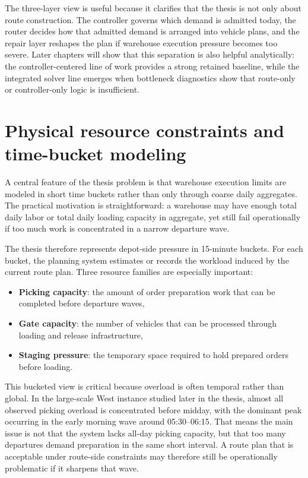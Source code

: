 The three-layer view is useful because it clarifies that the thesis is not only about route construction. The controller governs which demand is admitted today, the router decides how that admitted demand is arranged into vehicle plans, and the repair layer reshapes the plan if warehouse execution pressure becomes too severe. Later chapters will show that this separation is also helpful analytically: the controller-centered line of work provides a strong retained baseline, while the integrated solver line emerges when bottleneck diagnostics show that route-only or controller-only logic is insufficient.

\section{Physical resource constraints and time-bucket modeling}

A central feature of the thesis problem is that warehouse execution limits are modeled in short time buckets rather than only through coarse daily aggregates. The practical motivation is straightforward: a warehouse may have enough total daily labor or total daily loading capacity in aggregate, yet still fail operationally if too much work is concentrated in a narrow departure wave.

The thesis therefore represents depot-side pressure in 15-minute buckets. For each bucket, the planning system estimates or records the workload induced by the current route plan. Three resource families are especially important:
\begin{itemize}
    \item \textbf{Picking capacity}: the amount of order preparation work that can be completed before departure waves,
    \item \textbf{Gate capacity}: the number of vehicles that can be processed through loading and release infrastructure,
    \item \textbf{Staging pressure}: the temporary space required to hold prepared orders before loading.
\end{itemize}

This bucketed view is critical because overload is often temporal rather than global. In the large-scale West instance studied later in the thesis, almost all observed picking overload is concentrated before midday, with the dominant peak occurring in the early morning wave around 05:30--06:15. That means the main issue is not that the system lacks all-day picking capacity, but that too many departures demand preparation in the same short interval. A route plan that is acceptable under route-side constraints may therefore still be operationally problematic if it sharpens that wave.


